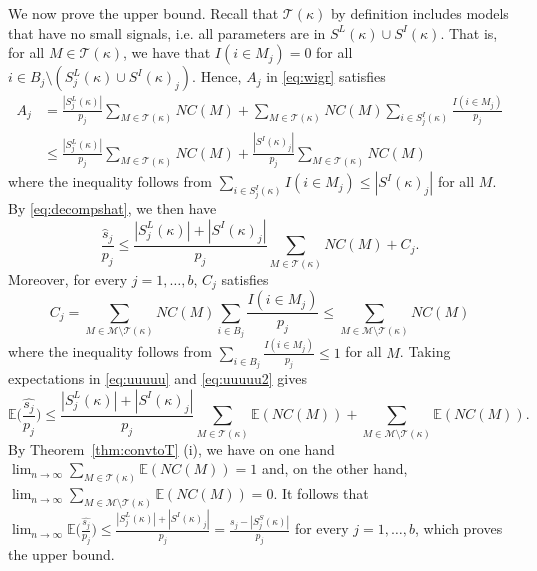 \documentclass[bj,authoryear]{imsart}
\theoremstyle{plain}
\newcommand{\E}{\mathbb{E}}
\newcommand{\M}{\mathcal{M}}
\newcommand{\T}{\mathcal{T}}
\begin{document}
We now prove the upper bound. Recall that $\T(\kappa)$ by definition includes models that have no small signals, i.e. all parameters are in $S^L(\kappa) \cup S^I(\kappa)$. That is,
for all $M\in\T(\kappa)$, we have that $I(i\in M_j)=0$ for all $i\in B_j\setminus(S^{L}_j(\kappa)\cup S^{I}(\kappa)_j)$. Hence, $A_j$ in \eqref{eq:wigr} satisfies
\begin{align*}
    A_j
   &= \frac{|S^{L}_j(\kappa)|}{p_j}\sum_{M \in \T(\kappa)}NC(M)+\sum_{M \in \T(\kappa)}NC(M)\sum_{i \in S^{I}_j(\kappa)}\frac{I(i\in M_j)}{p_j}\\
   &\leq\frac{|S^{L}_j(\kappa)|}{p_j}\sum_{M \in \T(\kappa)}NC(M)+ \frac{|S^{I}(\kappa)_j|}{p_j}\sum_{M \in \T(\kappa)}NC(M)
\end{align*}
where the inequality follows from $\sum_{i \in S^{I}_j(\kappa)} I(i\in M_j) \leq |S^{I}(\kappa)_j|$  for all $M$. By \eqref{eq:decompshat}, we then have
\begin{equation}\label{eq:uuuuu}
    \frac{\widehat{s}_j}{p_j}\leq \frac{|S^{L}_j(\kappa)|+|S^{I}(\kappa)_j|}{p_j}\sum_{M \in \T(\kappa)}NC(M) + C_j.
\end{equation}
Moreover, for every $j=1,\ldots,b$, $C_j$ satisfies
\begin{equation}\label{eq:uuuuu2}
    C_j = \sum_{M \in \M\setminus \T(\kappa)}NC(M)\sum_{i \in B_j}\frac{I(i\in M_j)}{p_j}\leq \sum_{M \in \M\setminus \T(\kappa)}NC(M)
\end{equation}
where the inequality follows from $\sum_{i \in B_j}\frac{I(i\in M_j)}{p_j}\leq 1$ for all $M$.
Taking expectations in \eqref{eq:uuuuu} and \eqref{eq:uuuuu2} gives
\begin{equation*}
    \E\bigg(\frac{\widehat{s_j}}{p_j}\bigg) 
    \leq \frac{|S^{L}_j(\kappa)|+|S^{I}(\kappa)_j|}{p_j}\sum_{M \in \T(\kappa)}\E(NC(M)) + \sum_{M \in \M\setminus \T(\kappa)}\E(NC(M)).
\end{equation*}
 By Theorem~\ref{thm:convtoT} (i), we have on one hand $\lim_{n\to \infty}\sum_{M \in \T(\kappa)}\E(NC(M))= 1$ and, on the other hand, $\lim_{n\to \infty}\sum_{M \in \M\setminus\T(\kappa)}\E(NC(M))= 0$. It follows that $ \lim_{n\to \infty}\E\big(\frac{\widehat{s_j}}{p_j}\big) \leq  \frac{|S^{L}_j(\kappa)|+|S^{I}(\kappa)_j|}{p_j}= \frac{s_j-|S^{S}_j(\kappa)|}{p_j}$ for every $j=1,\ldots,b$, which proves the upper bound.
\end{document}
